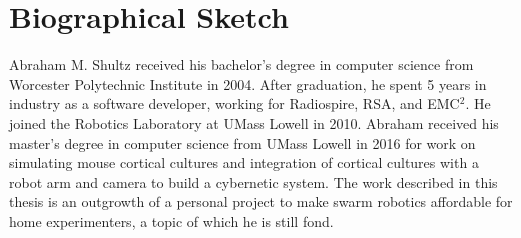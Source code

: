 
\section{Biographical Sketch}
Abraham M. Shultz received his bachelor's degree in computer science from Worcester Polytechnic Institute in 2004.
After graduation, he spent 5 years in industry as a software developer, working for Radiospire, RSA, and EMC$^2$.
He joined the Robotics Laboratory at UMass Lowell in 2010. 
Abraham received his master's degree in computer science from UMass Lowell in 2016 for work on simulating mouse cortical cultures and integration of cortical cultures with a robot arm and camera to build a cybernetic system. 
The work described in this thesis is an outgrowth of a personal project to make swarm robotics affordable for home experimenters, a topic of which he is still fond. 